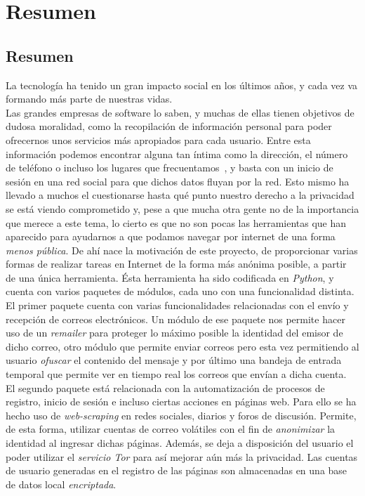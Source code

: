 \chapter*{Resumen}

\section*{Resumen}
La tecnología ha tenido un gran impacto social en los últimos años, y cada vez va formando más parte de nuestras vidas.\\
Las grandes empresas de software lo saben, y muchas de ellas tienen objetivos de dudosa moralidad, como la recopilación de información personal para poder ofrecernos unos servicios más apropiados para cada usuario. Entre esta información podemos encontrar alguna tan íntima como la dirección, el número de teléfono o incluso los lugares que frecuentamos~\cite{article:google}, y basta con un inicio de sesión en una red social para que dichos datos fluyan por la red.
Esto mismo ha llevado a muchos el cuestionarse hasta qué punto nuestro derecho a la privacidad se está viendo comprometido y, pese a que mucha otra gente no de la importancia que merece a este tema, lo cierto es que no son pocas las herramientas que han aparecido para ayudarnos a que podamos navegar por internet de una forma \textit{menos pública}.
De ahí nace la motivación de este proyecto, de proporcionar varias formas de realizar tareas en Internet de la forma más anónima posible, a partir de una única herramienta. Ésta herramienta ha sido codificada en \textit{Python}, y cuenta con varios paquetes de módulos, cada uno con una funcionalidad distinta.\\
El primer paquete cuenta con varias funcionalidades relacionadas con el envío y recepción de correos electrónicos. Un módulo de ese paquete nos permite hacer uso de un \textit{remailer} para proteger lo máximo posible la identidad del emisor de dicho correo, otro módulo que permite enviar correos pero esta vez permitiendo al usuario \textit{ofuscar} el contenido del mensaje y por último una bandeja de entrada temporal que permite ver en tiempo real los correos que envían a dicha cuenta.\\
El segundo paquete está relacionada con la automatización de procesos de registro, inicio de sesión e incluso ciertas acciones en páginas web. Para ello se ha hecho uso de \textit{web-scraping} en redes sociales, diarios y foros de discusión. Permite, de esta forma, utilizar cuentas de correo volátiles con el fin de \textit{anonimizar} la identidad al ingresar dichas páginas. Además, se deja a disposición del usuario el poder utilizar el \textit{servicio Tor} para así mejorar aún más la privacidad. Las cuentas de usuario generadas en el registro de las páginas son almacenadas en una base de datos local \textit{encriptada}. \\
